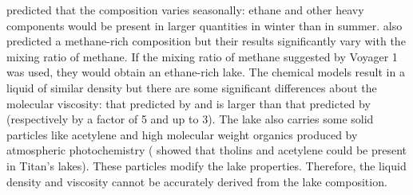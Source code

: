 \citet{tan2015titan} predicted that the composition varies seasonally: ethane and other heavy components would be present in larger quantities in winter than in summer. \citet{glein2013geochemical} also predicted a methane-rich composition but their results significantly vary with the mixing ratio of methane. If the mixing ratio of methane suggested by Voyager 1 was used, they would obtain an ethane-rich lake. The chemical models result in a liquid of similar density but there are some significant differences about the molecular viscosity: that predicted by \citet{cordier2009estimate} and \citet{luspay2015experimental} is larger than that predicted by \citet{tan2013titan} (respectively by a factor of 5 and up to 3). The lake also carries some solid particles like acetylene and high molecular weight organics produced by atmospheric photochemistry \citep[see e.g.][]{lorenz2010threshold, lorenz2011cyanide, lorenz2013oceanography} (\citet{tan2013titan} showed that tholins and acetylene could be present in Titan's lakes). These particles modify the lake properties. Therefore, the liquid density and viscosity cannot be accurately derived from the lake composition. 



